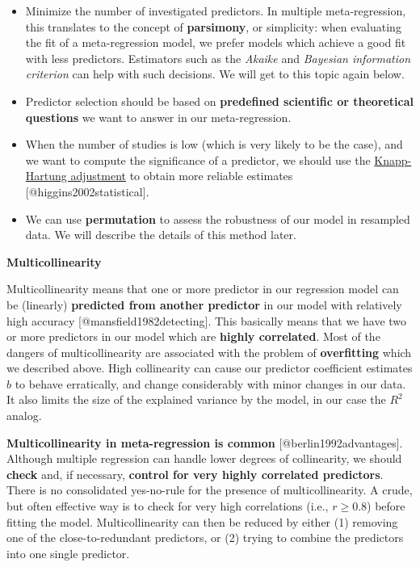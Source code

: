 \documentclass[]{book}
\providecommand{\tightlist}{%
  \setlength{\itemsep}{0pt}\setlength{\parskip}{0pt}}
\begin{document}
\begin{rmdachtung}
\begin{itemize}
\tightlist
\item
  Minimize the number of investigated predictors. In multiple
  meta-regression, this translates to the concept of \textbf{parsimony},
  or simplicity: when evaluating the fit of a meta-regression model, we
  prefer models which achieve a good fit with less predictors.
  Estimators such as the \emph{Akaike} and \emph{Bayesian information
  criterion} can help with such decisions. We will get to this topic
  again below.
\item
  Predictor selection should be based on \textbf{predefined scientific
  or theoretical questions} we want to answer in our meta-regression.
\item
  When the number of studies is low (which is very likely to be the
  case), and we want to compute the significance of a predictor, we
  should use the \protect\hyperlink{random}{Knapp-Hartung adjustment} to
  obtain more reliable estimates {[}@higgins2002statistical{]}.
\item
  We can use \textbf{permutation} to assess the robustness of our model
  in resampled data. We will describe the details of this method later.
\end{itemize}
\end{rmdachtung}

\begin{rmdachtung}
\textbf{Multicollinearity}

Multicollinearity means that one or more predictor in our regression
model can be (linearly) \textbf{predicted from another predictor} in our
model with relatively high accuracy {[}@mansfield1982detecting{]}. This
basically means that we have two or more predictors in our model which
are \textbf{highly correlated}. Most of the dangers of multicollinearity
are associated with the problem of \textbf{overfitting} which we
described above. High collinearity can cause our predictor coefficient
estimates \(b\) to behave erratically, and change considerably with
minor changes in our data. It also limits the size of the explained
variance by the model, in our case the \(R^2\) analog.

\textbf{Multicollinearity in meta-regression is common}
{[}@berlin1992advantages{]}. Although multiple regression can handle
lower degrees of collinearity, we should \textbf{check} and, if
necessary, \textbf{control for very highly correlated predictors}. There
is no consolidated yes-no-rule for the presence of multicollinearity. A
crude, but often effective way is to check for very high correlations
(i.e., \(r\geq0.8\)) before fitting the model. Multicollinearity can
then be reduced by either (1) removing one of the close-to-redundant
predictors, or (2) trying to combine the predictors into one single
predictor.
\end{rmdachtung}
\end{document}

